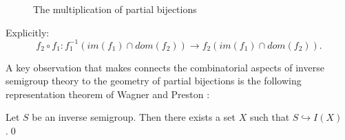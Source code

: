 \begin{figure}[h]
\begin{center}

\def\firstcircle{(-0.25,-1.25) circle (1.0cm)}
\def\secondcircle{(-0.25,0) circle (1.0cm)}
\def\thirdcircle{(-4.75,0) circle (1.0cm)}
\def\forthcircle{(-4.75,-2.5) circle (1.0cm)}
\def\fifthcircle{(-4.75,-1.25) circle (1.0cm)}

    
\setlength{\parskip}{5mm}

\caption{The multiplication of partial bijections}
\label{Fig:Comp}
\end{center}
\end{figure}
Explicitly:
\begin{equation*}
f_{2}\circ f_{1}: f_{1}^{-1}(im(f_{1})\cap dom(f_{2})) \rightarrow f_{2}(im(f_{1})\cap dom(f_{2})).
\end{equation*}

A key observation that makes connects the combinatorial aspects of inverse semigroup theory to the geometry of partial bijections is the following representation theorem of Wagner and Preston \cite{MR1455373}:

\begin{theorem}\label{Thm:WP}
Let $S$ be an inverse semigroup. Then there exists a set $X$ such that $S \hookrightarrow I(X)$.\qed
\end{theorem}


